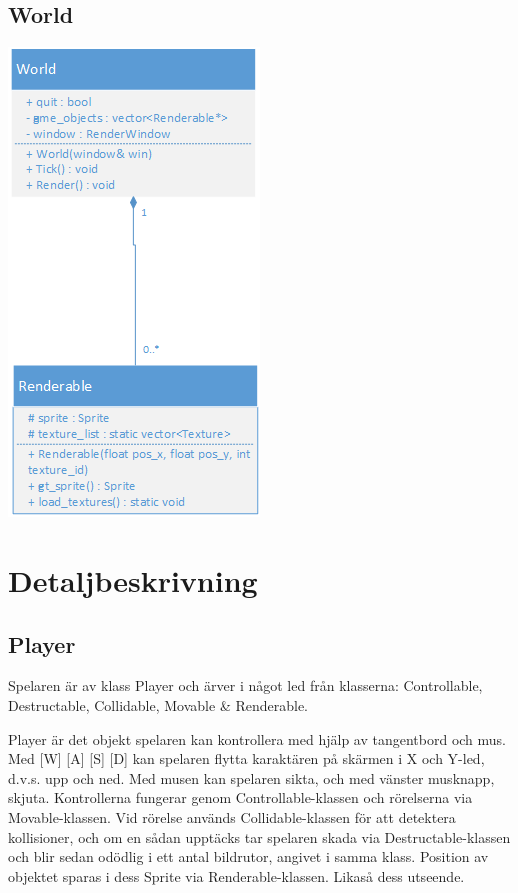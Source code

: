 \documentclass{TDP005mall}
\begin{document}
\subsection{World}
\begin{center}
\includegraphics[scale=0.75]{Drawings/world.png}
\end{center}
\clearpage

\section{Detaljbeskrivning}

\subsection{Player}
Spelaren är av klass Player och ärver i något led från klasserna: Controllable,
Destructable, Collidable, Movable \& Renderable.

Player är det objekt spelaren kan kontrollera med hjälp av tangentbord och mus.
Med [W] [A] [S] [D] kan spelaren flytta karaktären på skärmen i X och Y-led,
d.v.s. upp och ned. Med musen kan spelaren sikta, och med vänster musknapp,
skjuta. Kontrollerna fungerar genom Controllable-klassen och rörelserna via
Movable-klassen. Vid rörelse används Collidable-klassen för att detektera
kollisioner, och om en sådan upptäcks tar spelaren skada via
Destructable-klassen och blir sedan odödlig i ett antal bildrutor, angivet i
samma klass. Position av objektet sparas i dess Sprite via Renderable-klassen.
Likaså dess utseende.
\end{document}
